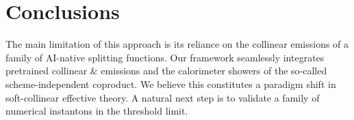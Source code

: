 \section{Conclusions}\label{sec:conclusions}

The main limitation of this approach is its reliance on the collinear
emissions of a family of AI-native splitting functions. Our framework
seamlessly integrates pretrained collinear & emissions and the calorimeter
showers of the so-called scheme-independent coproduct. We believe this
constitutes a paradigm shift in soft-collinear effective theory. A
natural next step is to validate a family of numerical instantons in the
threshold limit.

